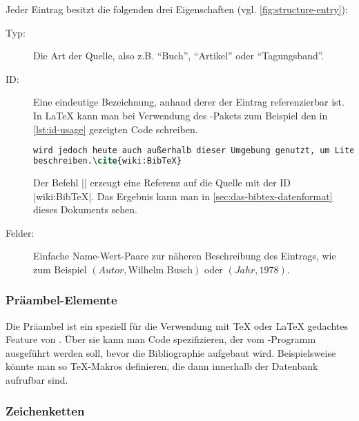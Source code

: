 Jeder Eintrag besitzt die folgenden drei Eigenschaften (vgl.
\autoref{fig:structure-entry}):

\begin{description}
    \item[Typ:] Die Art der Quelle, also z.B. \enquote{Buch}, \enquote{Artikel}
        oder \enquote{Tagungsband}.
    \item[ID:] Eine eindeutige Bezeichnung, anhand derer der Eintrag
        referenzierbar ist. In \LaTeX{} kann man bei Verwendung des
        \mbox{-}Pakets zum Beispiel den in \autoref{lst:id-usage}
        gezeigten Code schreiben.
\begin{lstlisting}[language=TeX,label=lst:id-usage,caption=Beispiel für die Nutzung einer Eintrags-ID]
% [...]
wird jedoch heute auch außerhalb dieser Umgebung genutzt, um Literaturquellen zu
beschreiben.\cite{wiki:BibTeX}
\end{lstlisting}
        \raggedright{
            Der Befehl \lstinlineTeX|\cite{wiki:BibTeX}| erzeugt eine Referenz
            auf die Quelle mit der ID \mbox{\lstinlineplain|wiki:BibTeX|}. Das
            Ergebnis kann man in \autoref{sec:das-bibtex-datenformat} dieses
            Dokuments sehen.
        }
    \item[Felder:] Einfache Name-Wert-Paare zur näheren Beschreibung des
        Eintrags, wie zum Beispiel $(Autor,\text{Wilhelm Busch})$ oder
        $(Jahr,1978)$.
\end{description}

\subsubsection{Präambel-Elemente}

Die Präambel ist ein speziell für die Verwendung mit \TeX{} oder \LaTeX{}
gedachtes Feature von \BibTeX{}. Über sie kann man Code spezifizieren, der
vom \mbox{\BibTeX-}Programm ausgeführt werden soll, bevor die Bibliographie
aufgebaut wird. Beispielsweise könnte man so \mbox{\TeX-}Makros definieren, die
dann innerhalb der Datenbank aufrufbar sind.

\subsubsection{Zeichenketten}

\def\temp{\enquote{Wikipedia, Die freie Enzyklopädie}}

